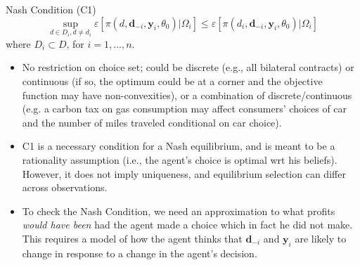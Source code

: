 \documentclass[aspectratio=169,11pt]{beamer}
\begin{document}
\begin{frame}{Nash Condition (C1)}
\begin{equation*}
\sup_{d\in D_{i},d\neq d_{i}}\varepsilon\left[ \pi (d,\symbf{d}_{-i},\symbf{y}_{i},\theta _{0})|\Omega_i \right] \leq \varepsilon\left[ \pi (d_{i},\symbf{d}_{-i},\symbf{y}_{i},\theta _{0})| \Omega_i \right] 
\end{equation*}
where $D_{i}\subset D$, for $i=1,...,n$.
\begin{itemize}
\footnotesize
\item No restriction on choice set; could be discrete (e.g., all bilateral
contracts) or continuous (if so, the optimum could be at a corner and the objective function may
have non-convexities), or a combination of discrete/continuous (e.g. a carbon tax on gas consumption may affect consumers' choices of car and the number of miles
traveled conditional on car choice).
\item C1 is a necessary condition for a Nash equilibrium, and is meant to be a rationality assumption (i.e., the agent's choice is optimal wrt his beliefs).  However, it does not imply uniqueness, and equilibrium selection can differ across observations.
\item To check the Nash Condition, we need an approximation to what profits \textit{%
would have been} had the agent made a choice which in fact he did not make.
This requires a model of how the agent thinks that $\symbf{d}_{-i}$ and $%
\symbf{y}_{i}$ are likely to change in response to a change in the agent's
decision. 
\end{itemize}
\end{frame}
\end{document}
